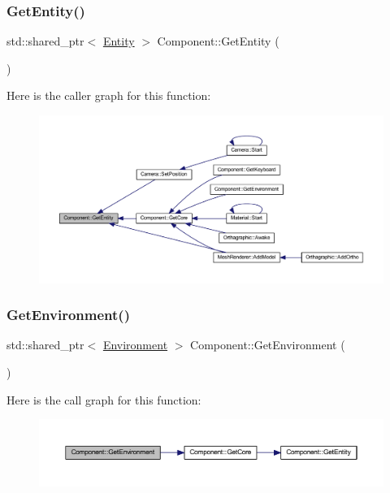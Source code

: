 \subsubsection{\texorpdfstring{Get\+Entity()}{GetEntity()}}
{\footnotesize\ttfamily std\+::shared\+\_\+ptr$<$ \mbox{\hyperlink{class_entity}{Entity}} $>$ Component\+::\+Get\+Entity (\begin{DoxyParamCaption}{ }\end{DoxyParamCaption})}

Here is the caller graph for this function\+:
\nopagebreak
\begin{figure}[H]
\begin{center}
\leavevmode
\includegraphics[width=350pt]{class_component_a746298ddfd39da5b191926aa8d8f6d95_icgraph}
\end{center}
\end{figure}
\mbox{\label{class_component_acc728e71f991a200996b9215b4b4739a}} 
\subsubsection{\texorpdfstring{Get\+Environment()}{GetEnvironment()}}
{\footnotesize\ttfamily std\+::shared\+\_\+ptr$<$ \mbox{\hyperlink{class_environment}{Environment}} $>$ Component\+::\+Get\+Environment (\begin{DoxyParamCaption}{ }\end{DoxyParamCaption})}

Here is the call graph for this function\+:
\nopagebreak
\begin{figure}[H]
\begin{center}
\leavevmode
\includegraphics[width=350pt]{class_component_acc728e71f991a200996b9215b4b4739a_cgraph}
\end{center}
\end{figure}
\mbox{\label{class_component_a1639a645d23caae1be3b952b850a65c4}} 
